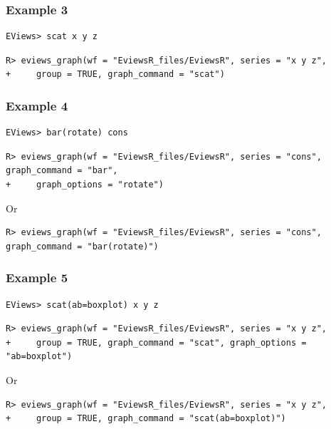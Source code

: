 \hypertarget{example-3}{%
\subsubsection{Example 3}\label{example-3}}

\begin{verbatim}
EViews> scat x y z
\end{verbatim}

\begin{verbatim}
R> eviews_graph(wf = "EviewsR_files/EviewsR", series = "x y z",
+     group = TRUE, graph_command = "scat")
\end{verbatim}

\hypertarget{example-4}{%
\subsubsection{Example 4}\label{example-4}}

\begin{verbatim}
EViews> bar(rotate) cons
\end{verbatim}

\begin{verbatim}
R> eviews_graph(wf = "EviewsR_files/EviewsR", series = "cons", graph_command = "bar",
+     graph_options = "rotate")
\end{verbatim}

Or

\begin{verbatim}
R> eviews_graph(wf = "EviewsR_files/EviewsR", series = "cons", graph_command = "bar(rotate)")
\end{verbatim}

\hypertarget{example-5}{%
\subsubsection{Example 5}\label{example-5}}

\begin{verbatim}
EViews> scat(ab=boxplot) x y z
\end{verbatim}

\begin{verbatim}
R> eviews_graph(wf = "EviewsR_files/EviewsR", series = "x y z",
+     group = TRUE, graph_command = "scat", graph_options = "ab=boxplot")
\end{verbatim}

Or

\begin{verbatim}
R> eviews_graph(wf = "EviewsR_files/EviewsR", series = "x y z",
+     group = TRUE, graph_command = "scat(ab=boxplot)")
\end{verbatim}

